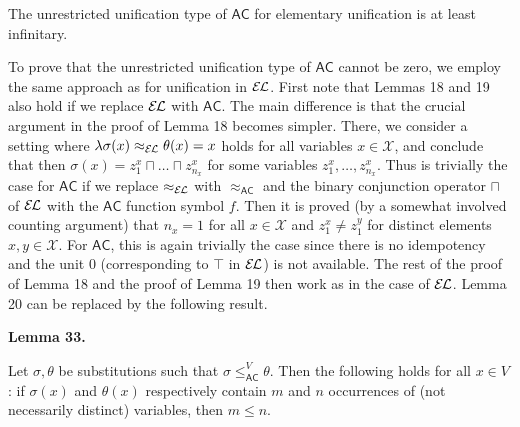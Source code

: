 \documentclass[10pt,a4paper]{amsart}
\begin{document}
 
The unrestricted unification type of $\mathsf{AC}$ for elementary unification is at least infinitary.\par
 
 
 
 
To prove that the unrestricted unification type of $\mathsf{AC}$ cannot be zero, we employ the same approach as for unification in $\mathcal{E\mkern-1.618muL}$. First note that Lemmas 18 and 19 also hold if we replace $\mathcal{E\mkern-1.618muL}$ with $\mathsf{AC}$. The main difference is that the crucial argument in the proof of Lemma 18 becomes simpler. There, we consider a setting where $\lambda\sigma(x)\approx_{\mathcal{E\mkern-1.618muL}}\theta(x)=x$ holds for all variables $x\in\mathcal{X}$, and conclude that then $\sigma(x)=z_{1}^{x}\sqcap\ldots\sqcap z_{n_{x}}^{x}$ for some variables $z_{1}^{x},\ldots,z_{n_{x}}^{x}$. Thus is trivially the case for $\mathsf{AC}$ if we replace $\approx_{\mathcal{E\mkern-1.618muL}}$ with $\approx_{\mathsf{AC}}$ and the binary conjunction operator $\sqcap$ of $\mathcal{E\mkern-1.618muL}$ with the $\mathsf{AC}$ function symbol $f$. Then it is proved (by a somewhat involved counting argument) that $n_{x}=1$ for all $x\in\mathcal{X}$ and $z_{1}^{x}\neq z_{1}^{y}$ for distinct elements $x,y\in\mathcal{X}$. For $\mathsf{AC}$, this is again trivially the case since there is no idempotency and the unit $0$ (corresponding to $\top$ in $\mathcal{E\mkern-1.618muL}$) is not available. The rest of the proof of Lemma 18 and the proof of Lemma 19 then work as in the case of $\mathcal{E\mkern-1.618muL}$. Lemma 20 can be replaced by the following result.\par
 
 
 
\par\medskip\noindent\textbf{Lemma 33.}\par
 
 
Let $\sigma,\theta$ be substitutions such that $\sigma\leq_{\mathsf{AC}}^{V}\theta$. Then the following holds for all $x\in V$: if $\sigma(x)$ and $\theta(x)$ respectively contain $m$ and $n$ occurrences of (not necessarily distinct) variables, then $m\leq n$.\par
 
\end{document}
